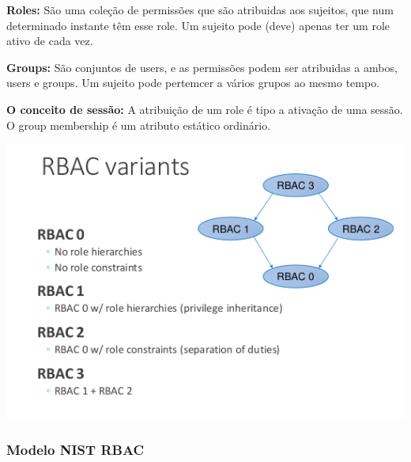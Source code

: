 \documentclass{article}
\begin{document}
\begin{flushleft}
  \textbf{Roles:} São uma coleção de permissões que são atribuidas aos sujeitos, que num
  determinado instante têm esse role. Um sujeito pode (deve) apenas ter um role ativo de cada vez.

  \vspace{2mm}

  \textbf{Groups:} São conjuntos de users, e as permissões podem ser atribuidas
  a ambos, users e groups. Um sujeito pode pertemcer a vários grupos ao mesmo tempo.

  \vspace{2mm}

  \textbf{O conceito de sessão:} A atribuição de um role é tipo a ativação de uma sessão.
  O group membership é um atributo estático ordinário.
\end{flushleft}

\begin{center}
  \includegraphics[scale=0.4]{16}
\end{center}

\subsubsection{Modelo NIST RBAC}
\end{document}

